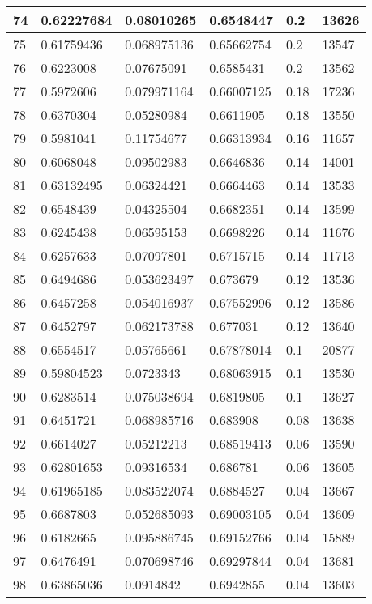 \begin{longtable}{|l|l|l|l|l|l|}
74 & 0.62227684 & 0.08010265 & 0.6548447 & 0.2 & 13626 \\ \hline 
75 & 0.61759436 & 0.068975136 & 0.65662754 & 0.2 & 13547 \\ \hline 
76 & 0.6223008 & 0.07675091 & 0.6585431 & 0.2 & 13562 \\ \hline 
77 & 0.5972606 & 0.079971164 & 0.66007125 & 0.18 & 17236 \\ \hline 
78 & 0.6370304 & 0.05280984 & 0.6611905 & 0.18 & 13550 \\ \hline 
79 & 0.5981041 & 0.11754677 & 0.66313934 & 0.16 & 11657 \\ \hline 
80 & 0.6068048 & 0.09502983 & 0.6646836 & 0.14 & 14001 \\ \hline 
81 & 0.63132495 & 0.06324421 & 0.6664463 & 0.14 & 13533 \\ \hline 
82 & 0.6548439 & 0.04325504 & 0.6682351 & 0.14 & 13599 \\ \hline 
83 & 0.6245438 & 0.06595153 & 0.6698226 & 0.14 & 11676 \\ \hline 
84 & 0.6257633 & 0.07097801 & 0.6715715 & 0.14 & 11713 \\ \hline 
85 & 0.6494686 & 0.053623497 & 0.673679 & 0.12 & 13536 \\ \hline 
86 & 0.6457258 & 0.054016937 & 0.67552996 & 0.12 & 13586 \\ \hline 
87 & 0.6452797 & 0.062173788 & 0.677031 & 0.12 & 13640 \\ \hline 
88 & 0.6554517 & 0.05765661 & 0.67878014 & 0.1 & 20877 \\ \hline 
89 & 0.59804523 & 0.0723343 & 0.68063915 & 0.1 & 13530 \\ \hline 
90 & 0.6283514 & 0.075038694 & 0.6819805 & 0.1 & 13627 \\ \hline 
91 & 0.6451721 & 0.068985716 & 0.683908 & 0.08 & 13638 \\ \hline 
92 & 0.6614027 & 0.05212213 & 0.68519413 & 0.06 & 13590 \\ \hline 
93 & 0.62801653 & 0.09316534 & 0.686781 & 0.06 & 13605 \\ \hline 
94 & 0.61965185 & 0.083522074 & 0.6884527 & 0.04 & 13667 \\ \hline 
95 & 0.6687803 & 0.052685093 & 0.69003105 & 0.04 & 13609 \\ \hline 
96 & 0.6182665 & 0.095886745 & 0.69152766 & 0.04 & 15889 \\ \hline 
97 & 0.6476491 & 0.070698746 & 0.69297844 & 0.04 & 13681 \\ \hline 
98 & 0.63865036 & 0.0914842 & 0.6942855 & 0.04 & 13603 \\ \hline 

\end{longtable}
